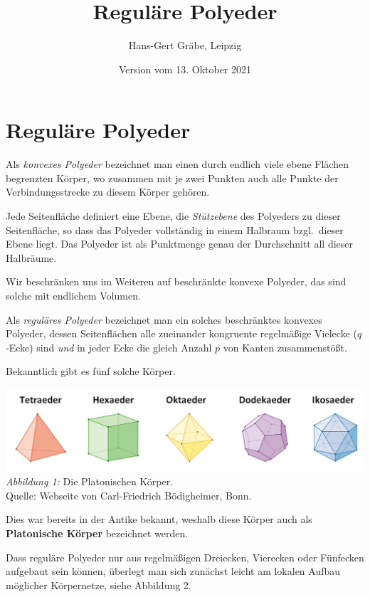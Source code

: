 \documentclass[11pt]{article}
\author{Hans-Gert Gräbe, Leipzig}
\title{Reguläre Polyeder\kosemnetlicensemark}
\date{Version vom 13. Oktober 2021}
\begin{document}
\maketitle

\section*{Reguläre Polyeder}

Als \emph{konvexes Polyeder} bezeichnet man einen durch endlich viele ebene
Flä\-chen begrenzten Körper, wo zusammen mit je zwei Punkten auch alle Punkte
der Verbindungsstrecke zu diesem Körper gehören.

Jede Seitenfläche definiert eine Ebene, die \emph{Stützebene} des Polyeders zu
dieser Seitenfläche, so dass das Polyeder vollständig in einem Halbraum
bzgl.\ dieser Ebene liegt. Das Polyeder ist als Punktmenge genau der
Durchschnitt all dieser Halbräume. 

Wir beschränken uns im Weiteren auf beschränkte konvexe Polyeder, das sind
solche mit endlichem Volumen. 

Als \emph{reguläres Polyeder} bezeichnet man ein solches beschränktes konvexes
Polyeder, dessen Seitenflächen alle zueinander kongruente regelmäßige Vielecke
($q$-Ecke) sind \emph{und} in jeder Ecke die gleich Anzahl $p$ von Kanten
zusammenstößt.

Bekanntlich gibt es fünf solche Körper.
\begin{center}
  \includegraphics[width=.8\textwidth]{graebe-05-1/PlatonischeKoerper.jpg}\\
  \emph{Abbildung 1:} Die Platonischen Körper.\\ Quelle: Webseite von
  Carl-Friedrich Bödigheimer, Bonn. 
\end{center}
Dies war bereits in der Antike bekannt, weshalb diese Körper auch als
\textbf{Platonische Körper} bezeichnet werden.  

Dass reguläre Polyeder nur aus regelmäßigen Dreiecken, Vierecken oder
Fünfecken aufgebaut sein können, überlegt man sich zunächst leicht am lokalen
Aufbau möglicher Körpernetze, siehe Abbildung 2.
\end{document}
